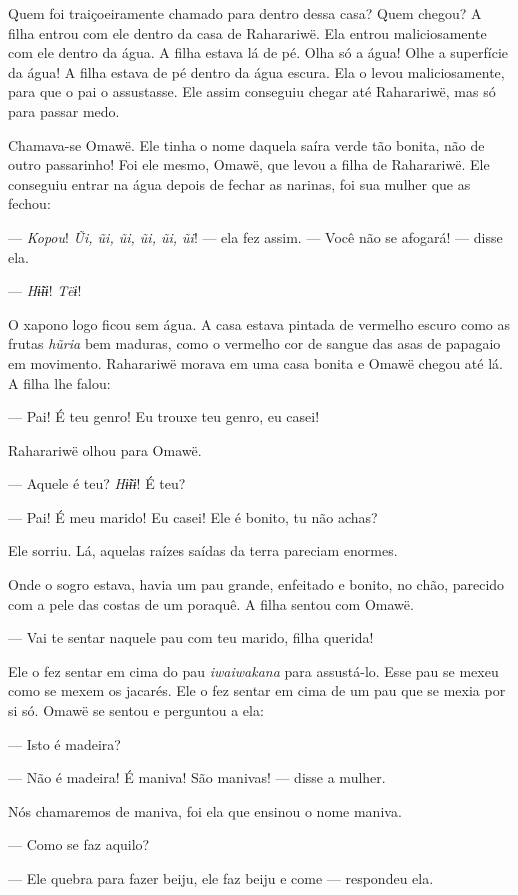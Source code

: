 Quem foi traiçoeiramente chamado para dentro dessa casa? Quem chegou? A
filha entrou com ele dentro da casa de Raharariwë. Ela
entrou maliciosamente com ele dentro da água. A filha estava lá de pé.
Olha só a água! Olhe a superfície da água! A filha estava de pé dentro
da água escura. Ela o levou maliciosamente, para que o pai o assustasse.
Ele assim conseguiu chegar até Raharariwë, mas só para passar medo. 

Chamava-se Omawë. Ele tinha o nome daquela saíra verde tão bonita, não
de outro passarinho! Foi ele mesmo, Omawë, que levou a filha de
Raharariwë. Ele conseguiu entrar na água depois de fechar as narinas,
foi sua mulher que as fechou:

--- \textit{Kopou}! \textit{Ũi, ũi, ũi, ũi, ũi, ũi}! --- ela fez assim. --- Você não se
afogará! --- disse ela. 

--- \textit{Hɨ̃ɨɨ}! \textit{Tëɨ}! 

O xapono logo ficou sem água. A casa estava pintada de vermelho escuro como
as frutas \textit{hũria} bem maduras, como o vermelho cor de sangue das
asas de papagaio em movimento. Raharariwë morava em uma casa bonita e
Omawë chegou até lá. A filha lhe falou:

--- Pai! É teu genro! Eu trouxe teu genro, eu casei! 

Raharariwë olhou para Omawë. 

--- Aquele é teu? \textit{Hɨ̃ɨɨ}! É teu?

--- Pai! É meu marido! Eu casei! Ele é bonito, tu não achas? 

Ele sorriu. Lá, aquelas raízes saídas da terra pareciam enormes.

Onde o sogro estava, havia um pau grande, enfeitado e bonito, no chão,
parecido com a pele das costas de um poraquê. A filha sentou com Omawë.

--- Vai te sentar naquele pau com teu marido, filha
querida! 

Ele o fez sentar em cima do pau \textit{iwaiwakana} para assustá-lo. Esse
pau se mexeu como se mexem os jacarés. Ele o fez sentar em cima de um
pau que se mexia por si só. Omawë se sentou e perguntou a ela: 

--- Isto é madeira?

--- Não é madeira! É maniva! São manivas! --- disse a mulher. 

Nós chamaremos de maniva, foi ela que ensinou o nome maniva. 

--- Como se faz aquilo? 

--- Ele quebra para fazer beiju, ele faz beiju e come --- respondeu
ela. 

